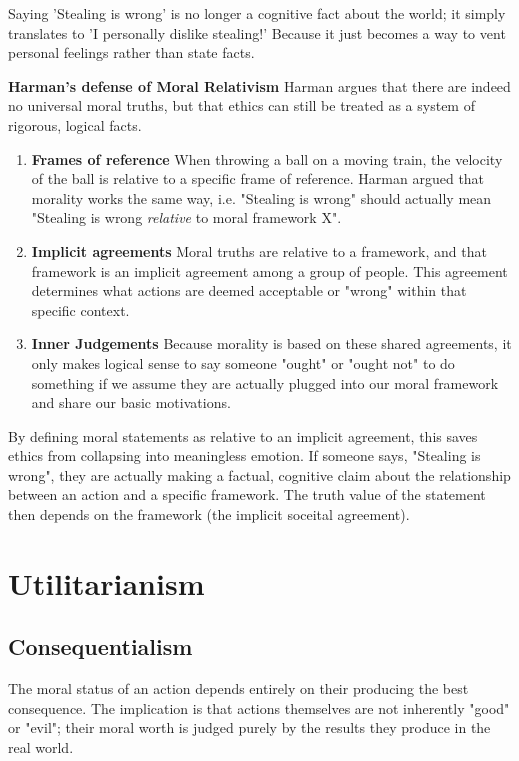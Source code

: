 \documentclass[12pt]{article}
\begin{document}
\noindent Saying 'Stealing is wrong' is no longer a cognitive fact about the world; it simply translates to 'I personally dislike stealing!' Because it just becomes a way to vent personal feelings rather than state facts.

\noindent\textbf{Harman's defense of Moral Relativism} 
Harman argues that there are indeed no universal moral truths, 
but that ethics can still be treated as a system of rigorous, logical facts.
\begin{enumerate}
    \item \textbf{Frames of reference} When throwing a ball on a moving train, the velocity of the ball is relative to a specific frame of reference.
    Harman argued that morality works the same way, i.e. "Stealing is wrong" should actually mean "Stealing is wrong \textit{relative} to moral framework X".
    \item \textbf{Implicit agreements} Moral truths are relative to a framework, and that framework is an implicit agreement among a group of people.
    This agreement determines what actions are deemed acceptable or "wrong" within that specific context.
    \item \textbf{Inner Judgements} Because morality is based on these shared agreements,
    it only makes logical sense to say someone "ought" or "ought not" to do something if we assume they are actually plugged into our moral framework and share our basic motivations.
\end{enumerate}
By defining moral statements as relative to an implicit agreement, this saves ethics from collapsing into meaningless emotion.
If someone says, "Stealing is wrong", they are actually making a factual, cognitive claim about the relationship between an action and a specific framework.
The truth value of the statement then depends on the framework (the implicit soceital agreement).

\newpage

\section{Utilitarianism}
\subsection{Consequentialism}
The moral status of an action depends entirely on their producing the best consequence.
The implication is that actions themselves are not inherently "good" or "evil"; their moral worth is judged purely by the results they produce in the real world.
\end{document}
